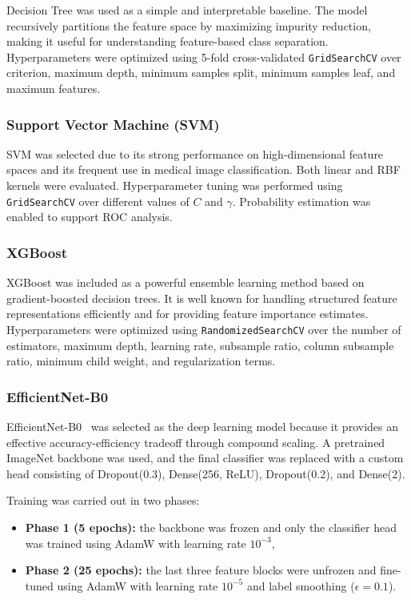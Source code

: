 \documentclass[conference]{IEEEtran}
\begin{document}
Decision Tree was used as a simple and interpretable baseline. The model recursively partitions the feature space by maximizing impurity reduction, making it useful for understanding feature-based class separation. Hyperparameters were optimized using 5-fold cross-validated \texttt{GridSearchCV} over criterion, maximum depth, minimum samples split, minimum samples leaf, and maximum features.

\subsubsection{Support Vector Machine (SVM)}

SVM was selected due to its strong performance on high-dimensional feature spaces and its frequent use in medical image classification. Both linear and RBF kernels were evaluated. Hyperparameter tuning was performed using \texttt{GridSearchCV} over different values of $C$ and $\gamma$. Probability estimation was enabled to support ROC analysis.

\subsubsection{XGBoost}

XGBoost was included as a powerful ensemble learning method based on gradient-boosted decision trees. It is well known for handling structured feature representations efficiently and for providing feature importance estimates. Hyperparameters were optimized using \texttt{RandomizedSearchCV} over the number of estimators, maximum depth, learning rate, subsample ratio, column subsample ratio, minimum child weight, and regularization terms.

\subsubsection{EfficientNet-B0}

EfficientNet-B0~\cite{tan2019} was selected as the deep learning model because it provides an effective accuracy-efficiency tradeoff through compound scaling. A pretrained ImageNet backbone was used, and the final classifier was replaced with a custom head consisting of Dropout(0.3), Dense(256, ReLU), Dropout(0.2), and Dense(2).

Training was carried out in two phases:
\begin{itemize}
    \item \textbf{Phase 1 (5 epochs):} the backbone was frozen and only the classifier head was trained using AdamW with learning rate $10^{-3}$,
    \item \textbf{Phase 2 (25 epochs):} the last three feature blocks were unfrozen and fine-tuned using AdamW with learning rate $10^{-5}$ and label smoothing ($\epsilon=0.1$).
\end{itemize}
\end{document}
